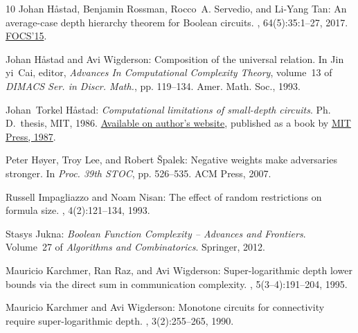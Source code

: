 \begin{thebibliography}{10}
{\sc Johan H{\aa}stad, Benjamin Rossman, Rocco~A. Servedio, and Li{-}Yang Tan}:
  An average-case depth hierarchy theorem for {B}oolean circuits.
, 64(5):35:1--27, 2017.
\newblock \prelim \href{https://doi.org/10.1109/FOCS.2015.67}{FOCS'15}.
\newblock [\epfmtdoi{10.1145/3095799}]

{\sc Johan H{\aa}stad and Avi Wigderson}: Composition of the universal
  relation.
\newblock In {\sc Jin yi~Cai}, editor, {\em Advances In Computational
  Complexity Theory}, volume~13 of {\em DIMACS Ser. in Discr. Math.}, pp.
  119--134. Amer. Math. Soc., 1993.

{\sc Johan~Torkel H{\aa}stad}: {\em Computational limitations of small-depth
  circuits}.
\newblock Ph.\,D.\ thesis, MIT, 1986.
\newblock \href{https://www.csc.kth.se/~johanh/thesis_with_figs.pdf}{Available
  on author's website}, published as a book by
  \href{https://mitpress.mit.edu/9780262081672/computational-limitations-for-small-depth-circuits/}{MIT
  Press, 1987}.

{\sc Peter H{\o}yer, Troy Lee, and Robert {\v{S}}palek}: Negative weights make
  adversaries stronger.
\newblock In {\em Proc. 39th STOC}, pp. 526--535. ACM Press, 2007.
\newblock [\epfmtdoi{10.1145/1250790.1250867}]

{\sc Russell Impagliazzo and Noam Nisan}: The effect of random restrictions on
  formula size.
, 4(2):121--134, 1993.

{\sc Stasys Jukna}: {\em {B}oolean Function Complexity -- Advances and
  Frontiers}.
\newblock Volume~27 of {\em Algorithms and Combinatorics}.
\newblock Springer, 2012.
\newblock [\epfmtdoi{10.1007/978-3-642-24508-4}]

{\sc Mauricio Karchmer, Ran Raz, and Avi Wigderson}: Super-logarithmic depth
  lower bounds via the direct sum in communication complexity.
, 5(3--4):191--204, 1995.
\newblock [\epfmtdoi{10.1007/BF01206317}]

{\sc Mauricio Karchmer and Avi Wigderson}: Monotone circuits for connectivity
  require super-logarithmic depth.
, 3(2):255--265, 1990.
\newblock [\epfmtdoi{10.1137/0403021}]


\end{thebibliography}
